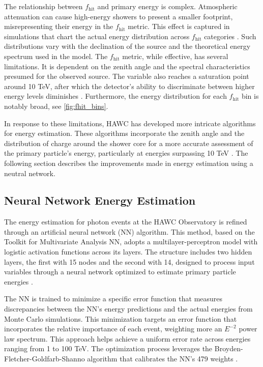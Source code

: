 The relationship between $f_{\text{hit}}$ and primary energy is complex.
Atmospheric attenuation can cause high-energy showers to present a smaller footprint, misrepresenting their energy in the $f_{\text{hit}}$ metric.
This effect is captured in simulations that chart the actual energy distribution across $f_{\text{hit}}$ categories \cite{wcd_Sensitivity}.
Such distributions vary with the declination of the source and the theoretical energy spectrum used in the model.
The $f_{\text{hit}}$ metric, while effective, has several limitations.
It is dependent on the zenith angle and the spectral characteristics presumed for the observed source.
The variable also reaches a saturation point around 10 TeV, after which the detector's ability to discriminate between higher energy levels diminishes \cite{Abeysekara_2017}.
Furthermore, the energy distribution for each $f_{\text{hit}}$ bin is notably broad, see \cref{fig:fhit_bins}.

In response to these limitations, HAWC has developed more intricate algorithms for energy estimation.
These algorithms incorporate the zenith angle and the distribution of charge around the shower core for a more accurate assessment of the primary particle's energy, particularly at energies surpassing 10 TeV \cite{wcd_Sensitivity}.
The following section describes the improvements made in energy estimation using a neutral network.

\subsection{Neural Network Energy Estimation}\label{sec:hawc_nn}

The energy estimation for photon events at the HAWC Observatory is refined through an artificial neural network (NN) algorithm.
This method, based on the Toolkit for Multivariate Analysis NN, adopts a multilayer-perceptron model with logistic activation functions across its layers.
The structure includes two hidden layers, the first with 15 nodes and the second with 14, designed to process input variables through a neural network optimized to estimate primary particle energies \cite{thesis_SamM}.

The NN is trained to minimize a specific error function that measures discrepancies between the NN's energy predictions and the actual energies from Monte Carlo simulations.
This minimization targets an error function that incorporates the relative importance of each event, weighting more an $E^{-2}$ power law spectrum.
This approach helps achieve a uniform error rate across energies ranging from 1 to 100 TeV.
The optimization process leverages the Broyden-Fletcher-Goldfarb-Shanno algorithm that calibrates the NN's 479 weights \cite{100TEV_Crab_HAWC}.

